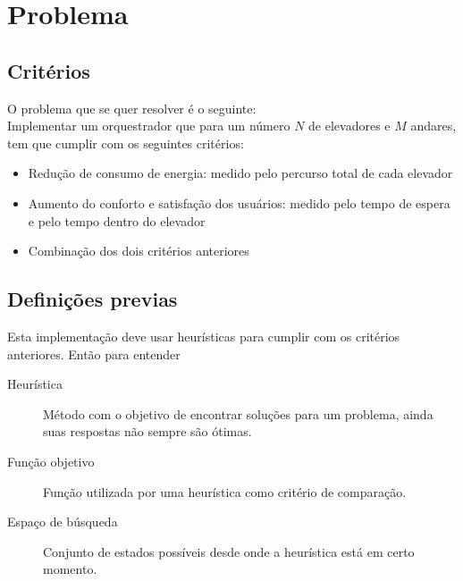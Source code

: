 \section{Problema} 

\subsection{Critérios}
	O problema que se quer resolver é o seguinte: \\
	Implementar um orquestrador que para um número $N$ de elevadores e $M$ andares, tem que cumplir com os seguintes critérios:
	\begin{itemize}
		\item Redução de consumo de energia: medido pelo percurso total de cada elevador
		\item Aumento do conforto e satisfação dos usuários: medido pelo tempo de espera e pelo tempo dentro do elevador
		\item Combinação dos dois critérios anteriores
	\end{itemize}
	
\subsection{Definições previas}
	Esta implementação deve usar heurísticas para cumplir com os critérios anteriores. Então para entender 		
	\begin{description}
		\item [Heurística] Método com o objetivo de encontrar soluções para um problema, ainda suas respostas não sempre são ótimas.
		\item[Função objetivo] Função utilizada por uma heurística como critério de comparação.
		\item[Espaço de búsqueda] Conjunto de estados possíveis desde onde a heurística está em certo momento.
	\end{description}